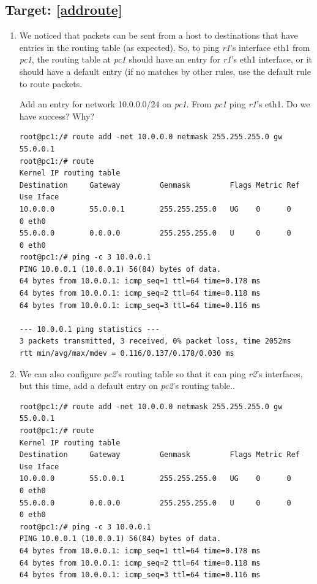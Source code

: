 \documentclass[12pt]{book}
\begin{document}
\begin{enumerate}[label=\arabic*.]
\subsection{Target: \ref{addroute}}\label{route.ipv4.3.se}

\begin{enumerate}[resume*]
\item We noticed that packets can be sent from a host to destinations that have entries in the routing table (as expected). So, to ping \emph{r1}'s interface eth1 from \emph{pc1}, the routing table at \emph{pc1} should have an entry for \emph{r1}'s eth1 interface, or it should have a default entry (if no matches by other rules, use the default rule to route packets.

  Add an entry for network 10.0.0.0/24 on \emph{pc1}. From \emph{pc1} ping \emph{r1}'s eth1. Do we have success? Why?

  \begin{lstlisting}
root@pc1:/# route add -net 10.0.0.0 netmask 255.255.255.0 gw 55.0.0.1
root@pc1:/# route
Kernel IP routing table
Destination     Gateway         Genmask         Flags Metric Ref    Use Iface
10.0.0.0        55.0.0.1        255.255.255.0   UG    0      0        0 eth0
55.0.0.0        0.0.0.0         255.255.255.0   U     0      0        0 eth0
root@pc1:/# ping -c 3 10.0.0.1
PING 10.0.0.1 (10.0.0.1) 56(84) bytes of data.
64 bytes from 10.0.0.1: icmp_seq=1 ttl=64 time=0.178 ms
64 bytes from 10.0.0.1: icmp_seq=2 ttl=64 time=0.118 ms
64 bytes from 10.0.0.1: icmp_seq=3 ttl=64 time=0.116 ms

--- 10.0.0.1 ping statistics ---
3 packets transmitted, 3 received, 0% packet loss, time 2052ms
rtt min/avg/max/mdev = 0.116/0.137/0.178/0.030 ms
  \end{lstlisting}

\item We can also configure \emph{pc2}'s routing table so that it can ping \emph{r2}'s interfaces, but this time, add a default entry on \emph{pc2}'s routing table..

  \begin{lstlisting}
root@pc1:/# route add -net 10.0.0.0 netmask 255.255.255.0 gw 55.0.0.1
root@pc1:/# route
Kernel IP routing table
Destination     Gateway         Genmask         Flags Metric Ref    Use Iface
10.0.0.0        55.0.0.1        255.255.255.0   UG    0      0        0 eth0
55.0.0.0        0.0.0.0         255.255.255.0   U     0      0        0 eth0
root@pc1:/# ping -c 3 10.0.0.1
PING 10.0.0.1 (10.0.0.1) 56(84) bytes of data.
64 bytes from 10.0.0.1: icmp_seq=1 ttl=64 time=0.178 ms
64 bytes from 10.0.0.1: icmp_seq=2 ttl=64 time=0.118 ms
64 bytes from 10.0.0.1: icmp_seq=3 ttl=64 time=0.116 ms


\end{lstlisting}
\end{enumerate}
\end{enumerate}
\end{document}
